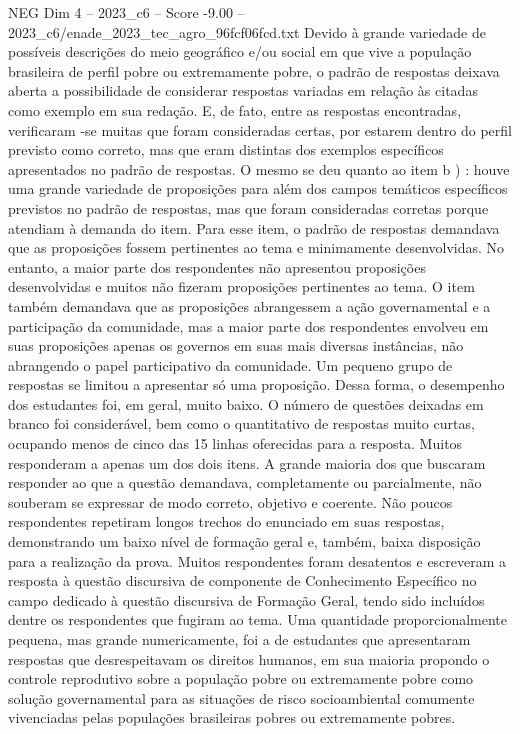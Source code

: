 \begin{textsample}{NEG Dim 4 – 2023\_c6 – Score -9.00 – 2023\_c6/enade\_2023\_tec\_agro\_96fcf06fcd.txt}
Devido à grande variedade de possíveis descrições do meio geográfico e/ou social em que vive a população brasileira de perfil pobre ou extremamente pobre, o padrão de respostas deixava aberta a possibilidade de considerar respostas variadas em relação às citadas como exemplo em sua redação.
E, de fato, entre as respostas encontradas, verificaram -se muitas que foram consideradas certas, por estarem dentro do perfil previsto como correto, mas que eram distintas dos exemplos específicos apresentados no padrão de respostas.
O mesmo se deu quanto ao item b ) : houve uma grande variedade de proposições para além dos campos temáticos específicos previstos no padrão de respostas, mas que foram consideradas corretas porque atendiam à demanda do item.
Para esse item, o padrão de respostas demandava que as proposições fossem pertinentes ao tema e minimamente desenvolvidas.
No entanto, a maior parte dos respondentes não apresentou proposições desenvolvidas e muitos não fizeram proposições pertinentes ao tema.
O item também demandava que as proposições abrangessem a ação governamental e a participação da comunidade, mas a maior parte dos respondentes envolveu em suas proposições apenas os governos em suas mais diversas instâncias, não abrangendo o papel participativo da comunidade.
Um pequeno grupo de respostas se limitou a apresentar só uma proposição.
Dessa forma, o desempenho dos estudantes foi, em geral, muito baixo.
O número de questões deixadas em branco foi considerável, bem como o quantitativo de respostas muito curtas, ocupando menos de cinco das 15 linhas oferecidas para a resposta.
Muitos responderam a apenas um dos dois itens.
A grande maioria dos que buscaram responder ao que a questão demandava, completamente ou parcialmente, não souberam se expressar de modo correto, objetivo e coerente.
Não poucos respondentes repetiram longos trechos do enunciado em suas respostas, demonstrando um baixo nível de formação geral e, também, baixa disposição para a realização da prova.
Muitos respondentes foram desatentos e escreveram a resposta à questão discursiva de componente de Conhecimento Específico no campo dedicado à questão discursiva de Formação Geral, tendo sido incluídos dentre os respondentes que fugiram ao tema.
Uma quantidade proporcionalmente pequena, mas grande numericamente, foi a de estudantes que apresentaram respostas que desrespeitavam os direitos humanos, em sua maioria propondo o controle reprodutivo sobre a população pobre ou extremamente pobre como solução governamental para as situações de risco socioambiental comumente vivenciadas pelas populações brasileiras pobres ou extremamente pobres.

\end{textsample}
